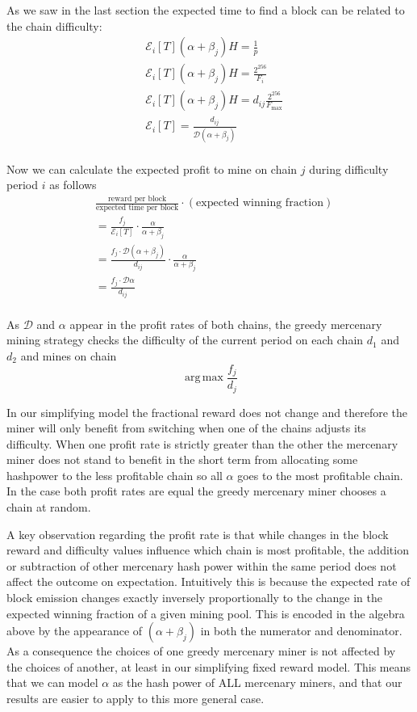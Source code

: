 \documentclass[10pt, preprint]{aastex}
\DeclareMathOperator*{\argmax}{arg\,max}
\begin{document}
As we saw in the last section the expected time to find a block can be related to the chain difficulty:
\begin{align*}
& \mathcal{E}_i[T] (\alpha + \beta_j)H = \frac{1}{p} \\
& \mathcal{E}_i[T] (\alpha + \beta_j)H = \frac{2^{256}}{F_{i}}\\
& \mathcal{E}_i[T] (\alpha + \beta_j)H = d_{ij} \frac{2^{256}}{F_{\text{max}}}\\
& \mathcal{E}_i[T] = \frac{d_{ij}}{\mathcal{D}(\alpha + \beta_j)} \\
\end{align*}

Now we can calculate the expected profit to mine on chain $j$ during difficulty period $i$ as follows
\begin{align*}
& \frac{\text{reward per block} }{\text{expected time per block}} \cdot (\text{expected winning fraction}) \\
&= \frac{f_j}{\mathcal{E}_i[T]} \cdot \frac{\alpha}{\alpha + \beta_j}\\
&= \frac{f_j \cdot \mathcal{D}(\alpha + \beta_j)}{d_{ij}} \cdot \frac{\alpha}{\alpha + \beta_j}\\
&= \frac{f_j \cdot \mathcal{D}\alpha}{d_{ij}}\\
\end{align*}

As $\mathcal{D}$ and $\alpha$ appear in the profit rates of both chains, the greedy mercenary mining strategy checks the difficulty of the current period on each chain $d_1$ and $d_2$ and mines on chain
$$\argmax{\frac{f_j}{d_j}}$$

In our simplifying model the fractional reward does not change and therefore the miner will only benefit from switching when one of the chains adjusts its difficulty.  When one profit rate is strictly greater than the other the mercenary miner does not stand to benefit in the short term from allocating some hashpower to the less profitable chain so all $\alpha$ goes to the most profitable chain.  In the case both profit rates are equal the greedy mercenary miner chooses a chain at random. 

A key observation regarding the profit rate is that while changes in the block reward and difficulty values influence which chain is most profitable, the addition or subtraction of other mercenary hash power within the same period does not affect the outcome on expectation.  Intuitively this is because the expected rate of block emission changes exactly inversely proportionally to the change in the expected winning fraction of a given mining pool.  This is encoded in the algebra above by the appearance of $(\alpha + \beta_j)$ in both the numerator and denominator.  As a consequence the choices of one greedy mercenary miner is not affected by the choices of another, at least in our simplifying fixed reward model.  This means that we can model $\alpha$ as the hash power of ALL mercenary miners, and that our results are easier to apply to this more general case.
\end{document}
